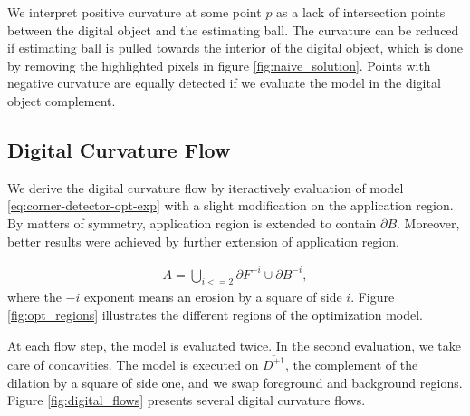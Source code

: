 \documentclass[runningheads]{llncs}
\begin{document}
We interpret positive curvature at some point $p$ as a lack of intersection points between the digital object and the estimating ball. The curvature can be reduced if estimating ball is pulled towards the interior of the digital object, which is done by removing the highlighted pixels in figure \ref{fig:naive_solution}. Points with negative curvature are equally detected if we evaluate the model in the digital object complement.

\subsection{Digital Curvature Flow}

We derive the digital curvature flow by iteractively evaluation of model \eqref{eq:corner-detector-opt-exp} with a slight modification on the application region. By matters of symmetry, application region is extended to contain $\partial B$. Moreover, better results were achieved by further extension of application region. 

\begin{align*}
	A = \bigcup_{i<=2}{ \partial F^{-i} \cup \partial B^{-i} },
\end{align*}
where the $-i$ exponent means an erosion by a square of side $i$. Figure \ref{fig:opt_regions} illustrates the different regions of the optimization model. 

At each flow step, the model is evaluated twice. In the second evaluation, we take care of concavities. The model is executed on $\overline{D^{+1}}$, the complement of the dilation by a square of side one, and we swap foreground and background regions. Figure \ref{fig:digital_flows} presents several digital curvature flows.
\end{document}
